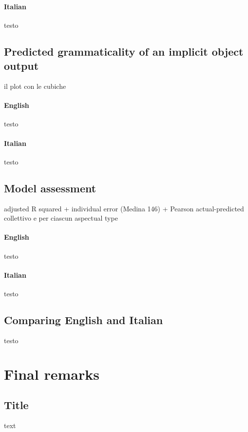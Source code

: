 \paragraph{Italian} testo


\subsection{Predicted grammaticality of an implicit object output} 

il plot con le cubiche

\paragraph{English} testo

\paragraph{Italian} testo


\subsection{Model assessment} 

adjusted R squared + 
individual error (Medina 146) +
Pearson actual-predicted collettivo e per ciascun aspectual type

\paragraph{English} testo

\paragraph{Italian} testo


\subsection{Comparing English and Italian} 

testo


\section{Final remarks} 

\subsection{Title} 

text
